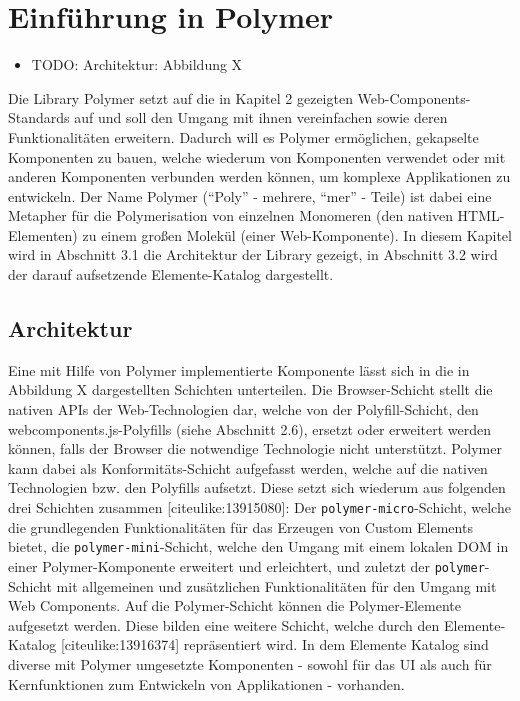 \chapter{Einführung in Polymer}\label{einfuxfchrung-in-polymer}

\begin{itemize}
\tightlist
\item
  TODO: Architektur: Abbildung X
\end{itemize}

Die Library Polymer setzt auf die in Kapitel 2 gezeigten
Web-Components-Standards auf und soll den Umgang mit ihnen vereinfachen
sowie deren Funktionalitäten erweitern. Dadurch will es Polymer
ermöglichen, gekapselte Komponenten zu bauen, welche wiederum von
Komponenten verwendet oder mit anderen Komponenten verbunden werden
können, um komplexe Applikationen zu entwickeln. Der Name Polymer
(``Poly'' - mehrere, ``mer'' - Teile) ist dabei eine Metapher für die
Polymerisation von einzelnen Monomeren (den nativen HTML-Elementen) zu
einem großen Molekül (einer Web-Komponente). In diesem Kapitel wird in
Abschnitt 3.1 die Architektur der Library gezeigt, in Abschnitt 3.2 wird
der darauf aufsetzende Elemente-Katalog dargestellt.

\section{Architektur}\label{architektur}

Eine mit Hilfe von Polymer implementierte Komponente lässt sich in die
in Abbildung X dargestellten Schichten unterteilen. Die Browser-Schicht
stellt die nativen APIs der Web-Technologien dar, welche von der
Polyfill-Schicht, den webcomponents.js-Polyfills (siehe Abschnitt 2.6),
ersetzt oder erweitert werden können, falls der Browser die notwendige
Technologie nicht unterstützt. Polymer kann dabei als
Konformitäts-Schicht aufgefasst werden, welche auf die nativen
Technologien bzw. den Polyfills aufsetzt. Diese setzt sich wiederum aus
folgenden drei Schichten zusammen {[}citeulike:13915080{]}: Der
\texttt{polymer-micro}-Schicht, welche die grundlegenden
Funktionalitäten für das Erzeugen von Custom Elements bietet, die
\texttt{polymer-mini}-Schicht, welche den Umgang mit einem lokalen DOM
in einer Polymer-Komponente erweitert und erleichtert, und zuletzt der
\texttt{polymer}-Schicht mit allgemeinen und zusätzlichen
Funktionalitäten für den Umgang mit Web Components. Auf die
Polymer-Schicht können die Polymer-Elemente aufgesetzt werden. Diese
bilden eine weitere Schicht, welche durch den Elemente-Katalog
{[}citeulike:13916374{]} repräsentiert wird. In dem Elemente Katalog
sind diverse mit Polymer umgesetzte Komponenten - sowohl für das UI als
auch für Kernfunktionen zum Entwickeln von Applikationen - vorhanden.

